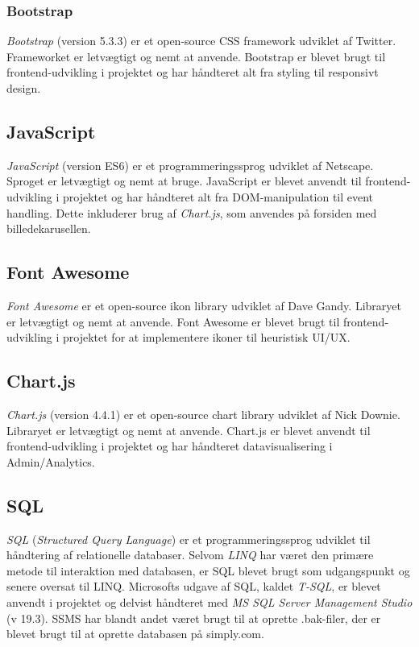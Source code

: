 \subsubsection{Bootstrap}
\emph{Bootstrap} (version 5.3.3) er et open-source CSS framework udviklet af Twitter. Frameworket er letvægtigt og nemt at anvende. Bootstrap er blevet brugt til frontend-udvikling i projektet og har håndteret alt fra styling til responsivt design.

\subsection{JavaScript}
\emph{JavaScript} (version ES6) er et programmeringssprog udviklet af Netscape. Sproget er letvægtigt og nemt at bruge. JavaScript er blevet anvendt til frontend-udvikling i projektet og har håndteret alt fra DOM-manipulation til event handling. Dette inkluderer brug af \emph{Chart.js}, som anvendes på forsiden med billedekarusellen.

\subsection{Font Awesome}
\emph{Font Awesome} er et open-source ikon library udviklet af Dave Gandy. Libraryet er letvægtigt og nemt at anvende. Font Awesome er blevet brugt til frontend-udvikling i projektet for at implementere ikoner til heuristisk UI/UX.

\subsection{Chart.js}
\emph{Chart.js} (version 4.4.1) er et open-source chart library udviklet af Nick Downie. Libraryet er letvægtigt og nemt at anvende. Chart.js er blevet anvendt til frontend-udvikling i projektet og har håndteret datavisualisering i Admin/Analytics.

\subsection{SQL}
\emph{SQL} (\emph{Structured Query Language}) er et programmeringssprog udviklet til håndtering af relationelle databaser. Selvom \emph{LINQ} har været den primære metode til interaktion med databasen, er SQL blevet brugt som udgangspunkt og senere oversat til LINQ. Microsofts udgave af SQL, kaldet \emph{T-SQL}, er blevet anvendt i projektet og delvist håndteret med \emph{MS SQL Server Management Studio} (v 19.3). SSMS har blandt andet været brugt til at oprette .bak-filer, der er blevet brugt til at oprette databasen på simply.com.

